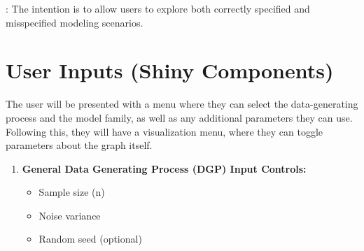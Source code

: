 \documentclass{article}
\begin{document}
\begin{normalsize}
        : The intention is to allow users to explore both correctly specified and misspecified modeling scenarios.
        \vspace{1em}


        
        \section{User Inputs (Shiny Components)}
           The user will be presented with a menu where they can select the data-generating process and the model family, as well as any additional parameters they can use. Following this, they will have a visualization menu, where they can toggle parameters about the graph itself.

        \vspace{1em}

        \begin{enumerate}
            \item \textbf{General Data Generating Process (DGP) Input Controls:} 
                \begin{itemize}
                    \item Sample size (n)
                    \item Noise variance
                    \item  Random seed (optional)
                \end{itemize}
                

\end{enumerate}
\end{normalsize}
\end{document}
